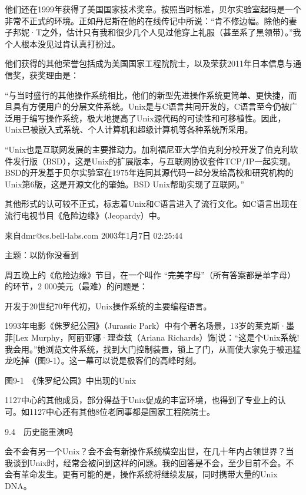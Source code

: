 \documentclass[a4paper,12pt,UTF8,twoside]{ctexbook}
\begin{document}
{{他们还在1999年获得了美国国家技术奖章。按照当时标准，贝尔实验室起码是一个非常不正式的环境。正如丹尼斯在他的在线传记中所说：“肯不修边幅。除他的妻子邦妮·T之外，估计只有我和很少几个人见过他穿上礼服（甚至系了黑领带）。”我个人根本没见过肯认真打扮过。

他们获得的其他荣誉包括成为美国国家工程院院士，以及荣获2011年日本信息与通信奖，获奖理由是：

“与当时盛行的其他操作系统相比，他们的新型先进操作系统更简单、更快捷，而且具有方便用户的分层文件系统。Unix是与C语言共同开发的，C语言至今仍被广泛用于编写操作系统，极大地提高了Unix源代码的可读性和可移植性。因此，Unix已被嵌入式系统、个人计算机和超级计算机等各种系统所采用。

“Unix也是互联网发展的主要推动力。加利福尼亚大学伯克利分校开发了伯克利软件发行版（BSD），这是Unix的扩展版本，与互联网协议套件TCP/IP一起实现。BSD的开发基于贝尔实验室在1975年连同其源代码一起分发给高校和研究机构的Unix第6版，这是开源文化的肇始。BSD Unix帮助实现了互联网。”



其他形式的认可较不正式，标志着Unix和C语言进入了流行文化。如C语言出现在流行电视节目《危险边缘》（Jeopardy）中。



来自dmr@cs.bell-labs.com 2003年1月7日 02:25:44

主题：以防你没看到

周五晚上的《危险边缘》节目，在一个叫作 “完美字母”（所有答案都是单字母）的环节，2 000美元（最难）的问题是：

开发于20世纪70年代初，Unix操作系统的主要编程语言。



1993年电影《侏罗纪公园》（Jurassic Park）中有个著名场景，13岁的莱克斯·墨菲[Lex Murphy，阿丽亚娜·理查兹（Ariana Richards）饰]说：“这是个Unix系统! 我会用。”她浏览文件系统，找到大门控制装置，锁上了门，从而使大家免于被迅猛龙吃掉（图9-1）。这一幕可以说是极客们的高峰时刻。



图9-1　《侏罗纪公园》中出现的Unix

1127中心的其他成员，部分得益于Unix促成的丰富环境，也得到了专业上的认可。如1127中心还有其他8位老同事都是国家工程院院士。





9.4　历史能重演吗


会不会有另一个Unix？会不会有新操作系统横空出世，在几十年内占领世界？当我谈到Unix时，经常会被问到这样的问题。我的回答是不会，至少目前不会。不会有革命发生。更有可能的是，操作系统将继续发展，同时携带大量的Unix DNA。

}}
\end{document}
